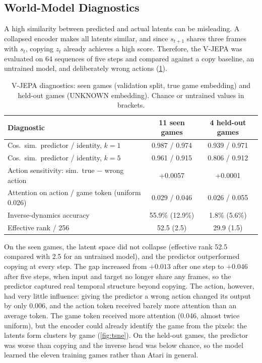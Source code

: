 \documentclass[runningheads,a4paper]{llncs}
\begin{document}
\subsection{World-Model Diagnostics}
\label{sec:jepa-diag}

A high similarity between predicted and actual latents can be misleading. A collapsed encoder
makes all latents similar, and since $s_{t+1}$ shares three frames with $s_t$, copying $z_t$
already achieves a high score. Therefore, the V-JEPA was evaluated on 64 sequences of five steps
and compared against a copy baseline, an untrained model, and deliberately wrong actions
(\cref{tab:jepa}).

\begin{table}[!t]
\centering
\caption{V-JEPA diagnostics: seen games (validation split, true game embedding) and held-out
games (UNKNOWN embedding). Chance or untrained values in brackets.}
\label{tab:jepa}
\footnotesize\setlength{\tabcolsep}{4pt}
\begin{tabular}{@{}lcc@{}}
\toprule
Diagnostic & 11 seen games & 4 held-out games \\
\midrule
Cos.\ sim.\ predictor / identity, $k=1$ & 0.987 / 0.974 & 0.939 / 0.971 \\
Cos.\ sim.\ predictor / identity, $k=5$ & 0.961 / 0.915 & 0.806 / 0.912 \\
Action sensitivity: sim.\ true $-$ wrong action & +0.0057 & +0.0001 \\
Attention on action / game token (uniform 0.026) & 0.029 / 0.046 & 0.026 / 0.055 \\
Inverse-dynamics accuracy & 55.9\% (12.9\%) & 1.8\% (5.6\%) \\
Effective rank / 256 & 52.5 (2.5) & 29.9 (1.5) \\
\bottomrule
\end{tabular}
\end{table}

On the seen games, the latent space did not collapse (effective rank 52.5 compared with 2.5 for
an untrained model), and the predictor outperformed copying at every step. The gap increased
from $+0.013$ after one step to $+0.046$ after five steps, when input and target no longer share any frames, so the predictor captured real temporal structure beyond copying. The action, however, had very little influence: giving the predictor a wrong action changed its output by
only 0.006, and the action token received barely more attention than an average token. The
game token received more attention (0.046, almost twice uniform), but the encoder could already
identify the game from the pixels: the latents form clusters by game (\cref{fig:tsne}). On the
held-out games, the predictor was worse than copying and the inverse head was below
chance, so the model learned the eleven training games rather than Atari in general.
\end{document}

